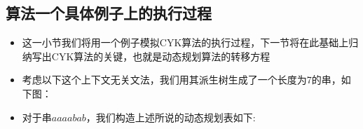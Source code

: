 \subsection{算法一个具体例子上的执行过程}\label{header-n1238}

\begin{itemize}
\item
  这一小节我们将用一个例子模拟CYK算法的执行过程，下一节将在此基础上归纳写出CYK算法的关键，也就是动态规划算法的转移方程
\item
  考虑以下这个上下文无关文法，我们用其派生树生成了一个长度为7的串，如下图：
\end{itemize}

\begin{itemize}
\item
  对于串\(aaaabab\)，我们构造上述所说的动态规划表如下:
\end{itemize}

